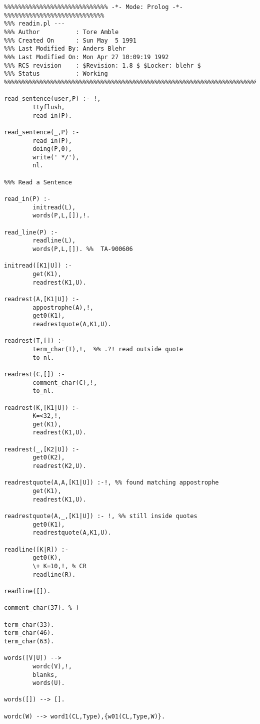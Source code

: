 \begin{verbatim}
%%%%%%%%%%%%%%%%%%%%%%%%%%%%% -*- Mode: Prolog -*- %%%%%%%%%%%%%%%%%%%%%%%%%%%%
%%% readin.pl --- 
%%% Author          : Tore Amble
%%% Created On      : Sun May  5 1991
%%% Last Modified By: Anders Blehr
%%% Last Modified On: Mon Apr 27 10:09:19 1992
%%% RCS revision    : $Revision: 1.8 $ $Locker: blehr $
%%% Status          : Working
%%%%%%%%%%%%%%%%%%%%%%%%%%%%%%%%%%%%%%%%%%%%%%%%%%%%%%%%%%%%%%%%%%%%%%%%%%%%%%

read_sentence(user,P) :- !,
        ttyflush,
        read_in(P).

read_sentence(_,P) :-
        read_in(P),
        doing(P,0),
        write(' */'),
        nl.

%%% Read a Sentence

read_in(P) :-
        initread(L),
        words(P,L,[]),!.

read_line(P) :-
        readline(L),
        words(P,L,[]). %%  TA-900606

initread([K1|U]) :-
        get(K1),
        readrest(K1,U).

readrest(A,[K1|U]) :- 
        appostrophe(A),!,
        get0(K1),
        readrestquote(A,K1,U).

readrest(T,[]) :- 
        term_char(T),!,  %% .?! read outside quote
        to_nl.

readrest(C,[]) :-
        comment_char(C),!,
        to_nl.

readrest(K,[K1|U]) :-
        K=<32,!,
        get(K1),
        readrest(K1,U).

readrest(_,[K2|U]) :-
        get0(K2),
        readrest(K2,U).

readrestquote(A,A,[K1|U]) :-!, %% found matching appostrophe
        get(K1),
        readrest(K1,U).

readrestquote(A,_,[K1|U]) :- !, %% still inside quotes
        get0(K1),
        readrestquote(A,K1,U).    

readline([K|R]) :-
        get0(K),
        \+ K=10,!, % CR
        readline(R).

readline([]).

comment_char(37). %-)

term_char(33).
term_char(46).
term_char(63).

words([V|U]) --> 
        wordc(V),!,
        blanks,
        words(U).

words([]) --> [].

wordc(W) --> word1(CL,Type),{w01(CL,Type,W)}.


\end{verbatim}
